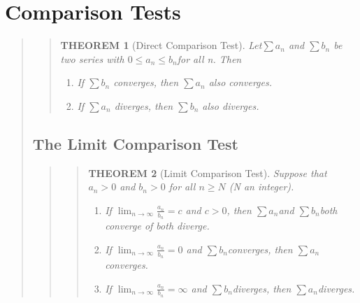 \documentclass{report}
\newtheorem{theorem}{THEOREM}
\begin{document}
\section{Comparison Tests }
\begin{quote}

	\begin{quote}
	\begin{theorem}[Direct Comparison Test]
		\mbox{}\par
		Let$\sum a_n$ and $\sum b_n $ be two series with $0\leq a_n \leq b_n$for all n. Then
		\begin{enumerate}
			\item If $\sum b_n$ converges, then $\sum a_n$ also converges.
			\item If $\sum a_n$ diverges, then $\sum b_n$ also diverges.
		\end{enumerate}
	\end{theorem}
	\end{quote}

	\subsection{The Limit Comparison Test}
	\begin{quote}
		
		\begin{quote}
			\begin{theorem}[Limit Comparison Test]
				Suppose that $a_n > 0$ and $b_n > 0$ for all $n \geq N$ (N an integer).
				\begin{enumerate}
					\item If $\lim_{n\to\infty} \frac{a_n}{b_n} = c$       and $c>0$, then $\sum a_n$and $\sum b_n$both converge of both diverge.
					\item If $\lim_{n\to\infty} \frac{a_n}{b_n} = 0$       and $\sum b_n$converges, then $\sum a_n$converges.
					\item If $\lim_{n\to\infty} \frac{a_n}{b_n} = \infty$  and $\sum b_n$diverges, then $\sum a_n$diverges.
				\end{enumerate}
			\end{theorem}
		\end{quote}

	\end{quote}

\end{quote}

\end{document}
